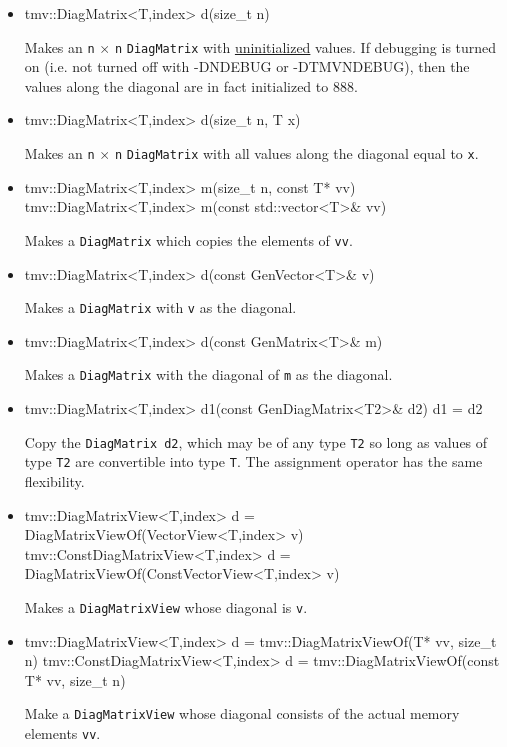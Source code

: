 \documentclass[twoside,letterpaper,11pt]{article}
\renewcommand{\tt}[1]{{\lstinline {#1}}}
\begin{document}
\begin{itemize}
\item 
\begin{tmvcode}
tmv::DiagMatrix<T,index> d(size_t n)
\end{tmvcode}
Makes an \tt{n} $\times$ \tt{n} \tt{DiagMatrix} with \underline{uninitialized} values.
If debugging is turned on (i.e. not turned off
with -DNDEBUG or -DTMVNDEBUG), then the values along the diagonal are in fact initialized to 888. 

\item
\begin{tmvcode}
tmv::DiagMatrix<T,index> d(size_t n, T x)
\end{tmvcode}
Makes an \tt{n} $\times$ \tt{n} \tt{DiagMatrix} with all values along the diagonal equal to \tt{x}.

\item
\begin{tmvcode}
tmv::DiagMatrix<T,index> m(size_t n, const T* vv)
tmv::DiagMatrix<T,index> m(const std::vector<T>& vv)
\end{tmvcode}
Makes a \tt{DiagMatrix} which copies the elements of \tt{vv}.

\item
\begin{tmvcode}
tmv::DiagMatrix<T,index> d(const GenVector<T>& v)
\end{tmvcode}
Makes a \tt{DiagMatrix} with \tt{v} as the diagonal.

\item 
\begin{tmvcode}
tmv::DiagMatrix<T,index> d(const GenMatrix<T>& m)
\end{tmvcode}
Makes a \tt{DiagMatrix} with the diagonal of \tt{m} as the diagonal.

\item
\begin{tmvcode}
tmv::DiagMatrix<T,index> d1(const GenDiagMatrix<T2>& d2)
d1 = d2
\end{tmvcode}
Copy the \tt{DiagMatrix d2}, which may be of any type \tt{T2} so long
as values of type \tt{T2} are convertible into type \tt{T}.
The assignment operator has the same flexibility.

\item
\begin{tmvcode}
tmv::DiagMatrixView<T,index> d = 
      DiagMatrixViewOf(VectorView<T,index> v)
tmv::ConstDiagMatrixView<T,index> d = 
      DiagMatrixViewOf(ConstVectorView<T,index> v)
\end{tmvcode}
Makes a \tt{DiagMatrixView} whose diagonal is \tt{v}.

\item
\begin{tmvcode}
tmv::DiagMatrixView<T,index> d = 
      tmv::DiagMatrixViewOf(T* vv, size_t n)
tmv::ConstDiagMatrixView<T,index> d = 
      tmv::DiagMatrixViewOf(const T* vv, size_t n)
\end{tmvcode}
Make a \tt{DiagMatrixView} whose diagonal consists of the actual memory elements \tt{vv}.

\end{itemize}
\end{document}

